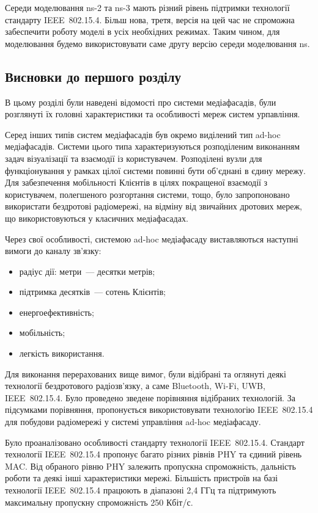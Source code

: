 \documentclass[a4paper,ukrainian,utf8,nocolumnsxix,floatsection,equationsection]{eskdtext}
\newcommand{\iee}[0]{IEEE~802.15.4\xspace}
\begin{document}
Середи моделювання ns-2 та ns-3 мають різний рівень підтримки технології стандарту \iee. Більш нова, третя, версія на цей час не спроможна забеспечити роботу моделі в усіх необхідних режимах. Таким чином, для моделювання будемо використовувати саме другу версію середи моделювання ns.


\subsection{Висновки до першого розділу}

В цьому розділі були наведені відомості про системи медіафасадів, були розглянуті їх головні характеристики та  особливості мереж систем урпавління.

Серед інших типів систем медіафасадів був окремо виділений тип ad-hoc медіафасадів. Системи цього типа характеризуються розподіленим виконанням задач візуалізації та взаємодії із користувачем. Розподілені вузли для функціонування у рамках цілої системи повинні бути об’єднані в єдину мережу. Для забезпечення мобільності Клієнтів в цілях покращеної взаємодії з користувачем, полегшеного розгортання системи, тощо, було запропоновано використати бездротові радіомережі, на відміну від звичайних дротових мереж, що використовуються у класичних медіафасадах.

Через свої особливості, системою ad-hoc медіафасаду виставляються наступні вимоги до каналу зв’язку:
\begin{itemize}
	\item радіус дії: метри~--- десятки метрів;
	\item підтримка десятків~--- сотень Клієнтів;
	\item енергоефективність;
	\item мобільність;
	\item легкість використання.
\end{itemize}

Для виконання перерахованих вище вимог, були відібрані та оглянуті деякі технології бездротового радіозв’язку, а саме Bluetooth, Wi-Fi, UWB, \iee. Було проведено зведене порівняння відібраних технологій. За підсумками порівняння, пропонується використовувати технологію \iee для побудови радіомережі у системі управління ad-hoc медіафасаду. 

Було проаналізовано особливості стандарту технології \iee. Стандарт технології \iee пропонує багато різних рівнів PHY та єдиний рівень MAC. Від обраного рівню PHY залежить пропускна спроможність, дальність роботи та деякі інші характеристики мережі. Більшість пристроїв на базі технології \iee працюють в діапазоні 2,4 ГГц та підтримують максимальну пропускну спроможність 250 Кбіт/с. 
\end{document}

